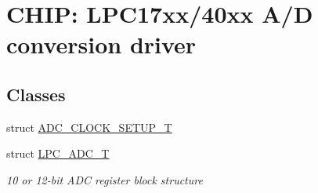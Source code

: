 \hypertarget{group__ADC__17XX__40XX}{}\section{C\+H\+IP\+: L\+P\+C17xx/40xx A/D conversion driver}
\label{group__ADC__17XX__40XX}
\subsection*{Classes}
\begin{DoxyCompactItemize}
\item 
struct \hyperlink{structADC__CLOCK__SETUP__T}{A\+D\+C\+\_\+\+C\+L\+O\+C\+K\+\_\+\+S\+E\+T\+U\+P\+\_\+T}
\item 
struct \hyperlink{structLPC__ADC__T}{L\+P\+C\+\_\+\+A\+D\+C\+\_\+T}
\begin{DoxyCompactList}\small\item\em 10 or 12-\/bit A\+DC register block structure \end{DoxyCompactList}\end{DoxyCompactItemize}
